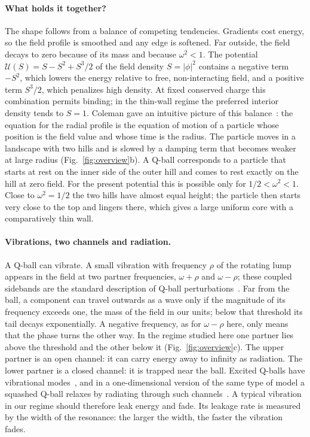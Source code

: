 \paragraph{What holds it together?}
The shape follows from a balance of competing tendencies. Gradients cost
energy, so the field profile is smoothed and any edge is softened. Far
outside, the field decays to zero because of its mass and because
$\omega^2<1$. The potential $\mathcal U(S)=S-S^2+S^3/2$ of the field
density $S=|\phi|^2$ contains a negative term $-S^2$, which lowers the
energy relative to free, non-interacting field, and a positive term
$S^3/2$, which penalizes high density. At fixed conserved charge this
combination permits binding; in the thin-wall regime the preferred
interior density tends to $S=1$. Coleman gave an intuitive picture of
this balance~\cite{Coleman1985}: the equation for the radial profile is
the equation of motion of a particle whose position is the field value
and whose time is the radius. The particle moves in a landscape with two
hills and is slowed by a damping term that becomes weaker at large
radius (Fig.~\ref{fig:overview}b). A Q-ball corresponds to a particle
that starts at rest on the inner side of the outer hill and comes to
rest exactly on the hill at zero field. For the present potential this
is possible only for $1/2<\omega^2<1$. Close to $\omega^2=1/2$ the two
hills have almost equal height; the particle then starts very close to
the top and lingers there, which gives a large uniform core with a
comparatively thin wall.

\paragraph{Vibrations, two channels and radiation.}
A Q-ball can vibrate. A small vibration with frequency $\rho$ of the
rotating lump appears in the field at two partner frequencies,
$\omega+\rho$ and $\omega-\rho$; these coupled sidebands are the standard
description of Q-ball perturbations~\cite{Kovtun2018}. Far from the
ball, a component can travel outwards as a wave only if the magnitude of
its frequency exceeds one, the mass of the field in our units; below
that threshold its tail decays exponentially. A negative frequency, as
for $\omega-\rho$ here, only means that the phase turns the other way.
In the regime studied here one partner lies above the threshold and the
other below it (Fig.~\ref{fig:overview}c). The upper partner is an open
channel: it can carry energy away to infinity as radiation. The lower
partner is a closed channel: it is trapped near the ball. Excited
Q-balls have vibrational modes~\cite{Kovtun2018}, and in a
one-dimensional version of the same type of model a squashed Q-ball
relaxes by radiating through such channels~\cite{Ciurla2024}. A typical
vibration in our regime should therefore leak energy and fade. Its
leakage rate is measured by the width of the resonance: the larger the
width, the faster the vibration fades.

